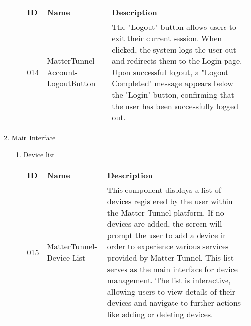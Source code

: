 \documentclass[conference]{IEEEtran}
\begin{document}
\begin{enumerate}[itemsep=2ex, parsep=1ex]
\begin{enumerate}[itemsep=2ex, parsep=1ex]
	      	      \begin{table}[h!]
	      	      	\def\arraystretch{1.24} \small
	      	      	\begin{tabular}{|p{1.2cm}|p{2.5cm}|p{4.0cm}|}
	      	      		\hline
	      	      		ID  & Name                              & Description                                                                                                                                                                                                                                                                                        \\
	      	      		\hline
	      	      		014 & MatterTunnel-Account-LogoutButton & The "Logout" button allows users to exit their current session. When clicked, the system logs the user out and redirects them to the Login page. Upon successful logout, a "Logout Completed" message appears below the "Login" button, confirming that the user has been successfully logged out. \\
	      	      		\hline
	      	      	\end{tabular}
	      	      \end{table}
	      \end{enumerate}
	      
	      \vspace{10cm}
	      
	\item Main Interface
	      \begin{enumerate}[itemsep=2ex, parsep=1ex]
	      	\item Device list
	      	      \begin{table}[h!]
	      	      	\def\arraystretch{1.24} \small
	      	      	\begin{tabular}{|p{1.2cm}|p{2.5cm}|p{4.0cm}|}
	      	      		\hline
	      	      		ID  & Name                     & Description                                                                                                                                                                                                                                                                                                                                                                                                                                             \\
	      	      		\hline
	      	      		015 & MatterTunnel-Device-List & This component displays a list of devices registered by the user within the Matter Tunnel platform. If no devices are added, the screen will prompt the user to add a device in order to experience various services provided by Matter Tunnel. This list serves as the main interface for device management. The list is interactive, allowing users to view details of their devices and navigate to further actions like adding or deleting devices. \\
	      	      		\hline
	      	      	\end{tabular}
	      	      \end{table}
	      	      

\end{enumerate}
\end{enumerate}
\end{document}
